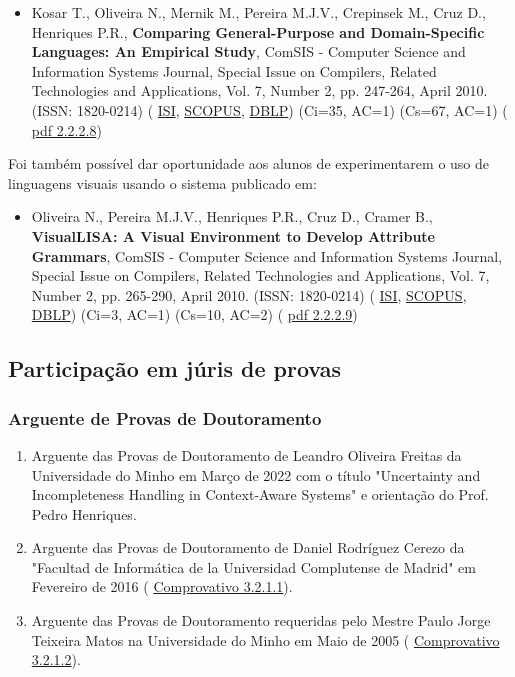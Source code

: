 \documentclass[11pt]{article}
\begin{document}
\begin{itemize}
\item{Kosar T., Oliveira N., Mernik M., Pereira M.J.V., Crepinsek M., Cruz D., Henriques P.R., {
\bf{ Comparing General-Purpose and Domain-Specific Languages: An Empirical Study}}, ComSIS - Computer Science and Information Systems Journal, Special Issue on Compilers, Related Technologies and Applications, Vol. 7, Number 2, pp. 247-264, April 2010. (ISSN: 1820-0214) (
\href{run:Publicacoes/ComprovativosISI.pdf}{ISI}, 
\href{run:Publicacoes/PublicacoesSCOPUS.pdf}{SCOPUS},
\href{run:Publicacoes/ComprovativosDBLP.pdf}{DBLP}) (Ci=35, AC=1) (Cs=67, AC=1) (
\href{run:Publicacoes/publicacoes/49.pdf}{pdf 2.2.2.8})}
\end{itemize}Foi também possível dar oportunidade aos alunos de experimentarem o uso de linguagens visuais usando o sistema publicado em:
\begin{itemize}
\item{Oliveira N., Pereira M.J.V., Henriques P.R., Cruz D., Cramer B., {
\bf{ VisualLISA: A Visual Environment to Develop Attribute Grammars}}, ComSIS - Computer Science and Information Systems Journal, Special Issue on Compilers, Related Technologies and Applications, Vol. 7, Number 2, pp. 265-290, April 2010. (ISSN: 1820-0214) (
\href{run:Publicacoes/ComprovativosISI.pdf}{ISI}, 
\href{run:Publicacoes/PublicacoesSCOPUS.pdf}{SCOPUS},
\href{run:Publicacoes/ComprovativosDBLP.pdf}{DBLP}) (Ci=3, AC=1) (Cs=10, AC=2) (
\href{run:Publicacoes/publicacoes/52.pdf}{pdf 2.2.2.9})}
\end{itemize}
\subsection{Participação em júris de provas}
\subsubsection{Arguente de Provas de Doutoramento}
\begin{enumerate}
\item{Arguente das Provas de Doutoramento de Leandro Oliveira Freitas da Universidade do Minho em Março de 2022 com o título "Uncertainty and Incompleteness Handling in Context-Aware Systems" e orientação do Prof. Pedro Henriques.}
\item{Arguente das Provas de Doutoramento de Daniel Rodríguez Cerezo da "Facultad de Informática de la Universidad Complutense de Madrid" em Fevereiro de 2016 (
\href{run:JuriProvas/TesisDaniel.pdf}{Comprovativo 3.2.1.1}).}
\item{Arguente das Provas de Doutoramento requeridas pelo Mestre Paulo Jorge Teixeira Matos na Universidade do Minho em Maio de 2005 (
\href{run:JuriProvas/JuriDoutoramentoPauloMatos.pdf}{Comprovativo 3.2.1.2}).}
\end{enumerate}
\end{document}

